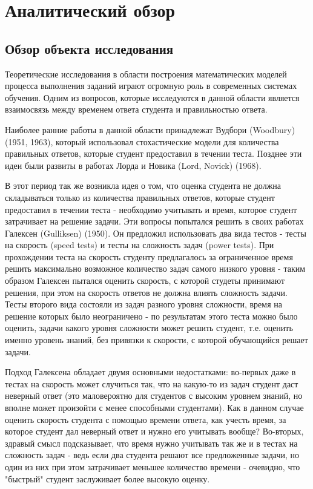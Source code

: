 \chapter{Аналитический обзор}
\label{mainpart} 
\section{Обзор объекта исследования}

Теоретические исследования в области построения математических моделей процесса выполнения заданий играют огромную роль в современных системах обучения. Одним из
вопросов, которые исследуются в данной области является взаимосвязь между временем ответа студента и правильностью ответа.

Наиболее ранние работы в данной области принадлежат Вудбори (Woodbury) (1951, 1963), который использовал стохастические модели для количества правильных ответов, которые студент предоставил в течении теста. Позднее эти идеи были развиты в работах  Лорда и Новика (Lord, Novick) (1968).

В этот период так же возникла идея о том, что оценка студента не должна складываться только из количества правильных ответов, которые студент предоставил в течении теста - необходимо учитывать и время, которое студент затрачивает на решение задачи. Эти вопросы попытался решить в своих работах Галексен (Gulliksen) (1950). Он предложил использовать два вида тестов - тесты на скорость (speed tests) и тесты на сложность задач (power tests). При прохождении теста на скорость студенту предлагалось за ограни\-ченное время решить максимально возможное количество задач самого низ\-кого уровня - таким образом Галексен пытался оценить скорость, с которой студеты принимают решения, при этом на скорость ответов не должна влиять сложность задачи. Тесты второго вида состояли из задач разного уровня сложности, время на решение которых было неограничено - по результатам этого теста можно было оценить, задачи какого уровня сложности может решить студент, т.е. оценить именно уровень знаний, без привязки к скорости, с которой обучающийся решает задачи.

 Подход Галексена обладает двумя основными недостатками: во-первых даже в тестах на скорость может случиться так, что на какую-то из задач студент даст неверный ответ (это маловероятно для студентов с высоким уровнем знаний, но вполне может произойти с менее способными студентами). Как в данном случае оценить скорость студента с помощью времени ответа, как учесть время, за которое студент дал неверный ответ и нужно его учиты\-вать вообще? Во-вторых, здравый смысл подсказывает, что время нужно учитывать так же и в тестах на сложность задач - ведь если два студента решают все предложенные задачи, но один из них при этом затрачивает меньшее количество времени - очевидно, что "быстрый" студент заслуживает более высокую оценку.

